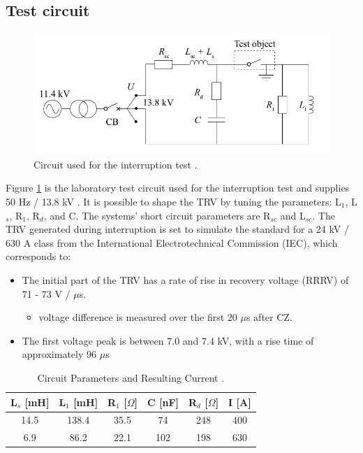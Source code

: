 \documentclass[10pt,a4paper,twoside]{article}
\begin{document}
\newpage
\subsection{Test circuit}

\begin{figure} [H]
\centering
\includegraphics[scale=0.3]{Bilder/Method/circuit.png}
\caption{Circuit used for the interruption test \cite{bib:AFIMVLBA}.} \label{fig:testCurcuit}
\end{figure}

Figure \ref{fig:testCurcuit} is the laboratory test circuit used for the interruption test and supplies 50 Hz / 13.8 kV . It is possible to shape the TRV by tuning the parameters: L$_1$, L$_s$, R$_1$, R$_d$, and C. The systems' short circuit parameters are R$_{sc}$ and L$_{sc}$. The TRV generated during interruption is set to simulate the standard for a 24 kV / 630 A class from the International Electrotechnical Commission (IEC), which corresponds to:

\begin{itemize}
\item The initial part of the TRV has a rate of rise in recovery voltage (RRRV) of 71 - 73 V / $\mu$s.
	\begin{itemize}
		\item voltage difference is measured over the first 20 $\mu$s after CZ.
	\end{itemize}
\item The first voltage peak is between 7.0 and 7.4 kV, with a rise time of approximately 96 $\mu$s
\end{itemize}

\begin{table}[H]
\center
\caption{Circuit Parameters and Resulting Current \cite{bib:AFIMVLBA}. }
\begin{tabular}{|c|c|c|c|c|c|}
\hline 
L$_s$ [mH] & L$_1$ [mH] & R$_1$ [$\Omega$] & C [nF] & R$_{d}$ [$\Omega$] & I [A] \\ 
\hline 
14.5 & 138.4 & 35.5 & 74 & 248 & 400 \\ 
\hline 
6.9 & 86.2 & 22.1 & 102 & 198 & 630 \\ 
\hline 
\end{tabular} 
\label{tab:testParameters}
\end{table}
\end{document}
